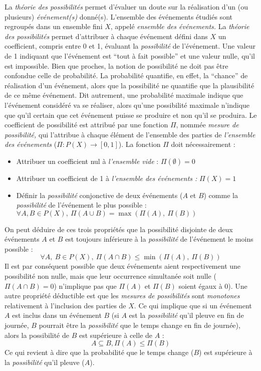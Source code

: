 La \emph{théorie des possibilités} permet d'évaluer un doute sur la
réalisation d'un (ou plusieurs) \emph{événement(s)}
donné(s). L'ensemble des événements étudiés sont regroupés dans un
ensemble fini \(X\), appelé \emph{ensemble des événements.} La
\emph{théorie des possibilités} permet d'attribuer à chaque événement
défini dans \(X\) un coefficient, compris entre 0 et 1, évaluant la
\emph{possibilité} de l'événement. Une valeur de 1 indiquant que
l'événement est \enquote{tout à fait possible}
\autocite[p. 43]{Bouchon-Meunier2007} et une valeur nulle, qu'il est
impossible. Bien que proches, la notion de possibilité ne doit pas
être confondue celle de probabilité. La probabilité quantifie, en
effet, la \enquote{chance} de réalisation d'un événement, alors que la
possibilité ne quantifie que la plausibilité de ce même événement. Dit
autrement, une probabilité maximale indique que l'événement considéré
va se réaliser, alors qu'une possibilité maximale n'indique que qu'il
certain que cet événement puisse se produire et non qu'il se produira.
Le coefficient de possibilité est attribué par une fonction \(Π\),
nommée \emph{mesure de possibilité,} qui l'attribue à chaque élément
de l'ensemble des parties de \emph{l'ensemble des événements}
(\(Π : P(X) → [0,1]\)). La fonction \(Π\) doit nécessairement :

\begin{itemize}
\item Attribuer un coefficient nul à \emph{l'ensemble vide} :
  \(Π(∅)=0\)
\item Attribuer un coefficient de 1 à \emph{l'ensemble des événements
    :} \(Π(X)=1\)
\item Définir la \emph{possibilité} conjonctive de deux événements
  (\(A\) et \(B\)) comme la \emph{possibilité} de l'événement le plus
  possible : \(∀ A,B ∈ P(X),\ Π(A ∪ B) = \max(Π(A),\ Π(B))\)
\end{itemize}

On peut déduire de ces trois propriétés \autocite{Bouchon-Meunier2007}
que la possibilité disjointe de deux événements \(A\) et \(B\) est
toujours inférieure à la \emph{possibilité} de l'événement le moins
possible :
%
\begin{equation}
  ∀ A,\ B ∈ P(X),\ Π(A ∩ B) ≤ \min(Π(A),\ Π(B))
\end{equation}
%
Il est par conséquent possible que deux événements aient
respectivement une possibilité non nulle, mais que leur occurrence
simultanée soit nulle (\( Π(A ∩ B) = 0\)) n'implique pas que \(Π(A)\)
et \(Π(B)\) soient égaux à 0). Une autre propriété déductible est que
les \emph{mesures de possibilités} sont \emph{monotones} relativement
à l'inclusion des parties de \(X\). Ce qui implique que si un
événement \(A\) est inclus dans un événement \(B\) (\eg si \(A\) est
la \emph{possibilité} qu'il pleuve en fin de journée, \(B\) pourrait
être la \emph{possibilité} que le temps change en fin de journée),
alors la possibilité de \(B\) est supérieure à celle de \(A\) :
%
\begin{equation}
  A \subseteq B, Π(A) ≤ Π(B)
\end{equation}
%
Ce qui revient à dire que la probabilité que le temps change (\(B\))
est supérieure à la \emph{possibilité} qu'il pleuve (\(A\)).

